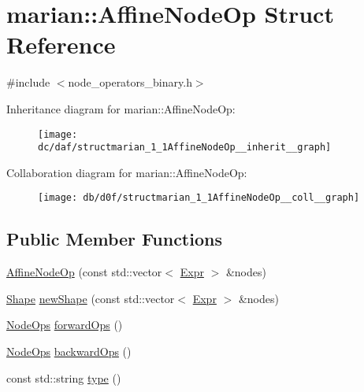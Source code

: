 \hypertarget{structmarian_1_1AffineNodeOp}{}\section{marian\+:\+:Affine\+Node\+Op Struct Reference}
\label{structmarian_1_1AffineNodeOp}


{\ttfamily \#include $<$node\+\_\+operators\+\_\+binary.\+h$>$}



Inheritance diagram for marian\+:\+:Affine\+Node\+Op\+:
\nopagebreak
\begin{figure}[H]
\begin{center}
\leavevmode
\texttt{[image: dc/daf/structmarian\_1\_1AffineNodeOp\_\_inherit\_\_graph]}
\end{center}
\end{figure}


Collaboration diagram for marian\+:\+:Affine\+Node\+Op\+:
\nopagebreak
\begin{figure}[H]
\begin{center}
\leavevmode
\texttt{[image: db/d0f/structmarian\_1\_1AffineNodeOp\_\_coll\_\_graph]}
\end{center}
\end{figure}
\subsection*{Public Member Functions}
\begin{DoxyCompactItemize}
\item 
\hyperlink{structmarian_1_1AffineNodeOp_a922e5094edaa7e7a84aa2e130d60a1b3}{Affine\+Node\+Op} (const std\+::vector$<$ \hyperlink{namespacemarian_a498d8baf75b754011078b890b39c8e12}{Expr} $>$ \&nodes)
\item 
\hyperlink{structmarian_1_1Shape}{Shape} \hyperlink{structmarian_1_1AffineNodeOp_a6a802543c6b3aeb37753ba775ac09c23}{new\+Shape} (const std\+::vector$<$ \hyperlink{namespacemarian_a498d8baf75b754011078b890b39c8e12}{Expr} $>$ \&nodes)
\item 
\hyperlink{namespacemarian_a4956376218cc236016c20bc4071470da}{Node\+Ops} \hyperlink{structmarian_1_1AffineNodeOp_a56e7eeac215b8dbbd1e138559f2dc10f}{forward\+Ops} ()
\item 
\hyperlink{namespacemarian_a4956376218cc236016c20bc4071470da}{Node\+Ops} \hyperlink{structmarian_1_1AffineNodeOp_a277f706113217219266122ccbd44679b}{backward\+Ops} ()
\item 
const std\+::string \hyperlink{structmarian_1_1AffineNodeOp_a455fa5b662dc84146f17058a50de2982}{type} ()
\end{DoxyCompactItemize}
